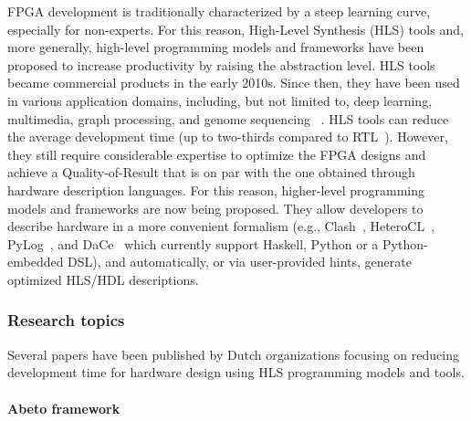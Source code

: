 FPGA development is traditionally characterized by a steep learning curve, especially for non-experts. For this reason, High-Level Synthesis (HLS) tools and, more generally, high-level programming models and frameworks have been proposed to increase productivity by raising the abstraction level. 
HLS tools became commercial products in the early 2010s. Since then, they have been used in various application domains, including, but not limited to, deep learning, multimedia, graph processing, and genome sequencing ~\cite{Cong-2022}. HLS tools can reduce the average development time (up to two-thirds compared to RTL~\cite{Lahti-2019}). However, they still require considerable expertise to optimize the FPGA designs and achieve a Quality-of-Result that is on par with the one obtained through hardware description languages. For this reason, higher-level programming models and frameworks are now being proposed. They allow developers %
to describe hardware %
in a more convenient formalism (e.g., Clash~\cite{clash-2010,clash-website}, HeteroCL~\cite{heterocl-2019}, PyLog~\cite{pylog-2021}, and DaCe~\cite{dace-2021} which currently support Haskell, Python or a Python-embedded DSL), and %
automatically, or via user-provided hints, generate optimized %
HLS/HDL descriptions. %


\subsubsection*{\bf{Research topics}} Several papers have been published by Dutch organizations focusing on reducing development time for hardware design using HLS programming models and tools.

\paragraph{Abeto framework%
}

